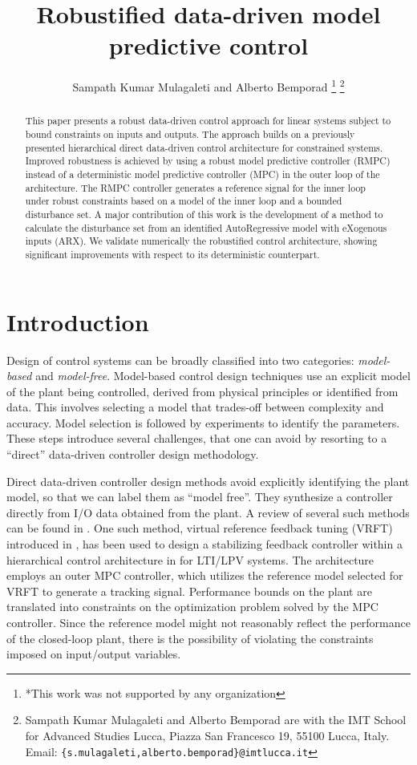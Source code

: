 \documentclass[letterpaper, 10 pt, conference]{ieeeconf}  %
\title{\LARGE \bf
Robustified data-driven model predictive control
}
\author{Sampath Kumar Mulagaleti and Alberto Bemporad%
\thanks{*This work was not supported by any organization}%
\thanks{Sampath Kumar Mulagaleti and Alberto Bemporad are with
		the IMT School for Advanced Studies Lucca, Piazza San Francesco 19,
		55100 Lucca, Italy. 
		 Email: 
	   {\tt\small \{s.mulagaleti,alberto.bemporad\}@imtlucca.it}}%
}
\begin{document}
\maketitle
\thispagestyle{empty}
\pagestyle{empty}


\begin{abstract}

This paper presents a robust data-driven control approach for linear systems subject to bound constraints on inputs and outputs.
 The approach builds on a previously presented hierarchical direct data-driven control architecture for constrained systems. Improved robustness is achieved by using a robust model predictive controller (RMPC) instead of a deterministic model predictive controller (MPC) in the outer loop of the architecture. The RMPC controller generates a reference signal for the inner loop under robust constraints based on a model of the inner loop and a bounded disturbance set. A major contribution of this work is the development of a method to calculate the disturbance set from an identified AutoRegressive model with eXogenous inputs (ARX). We validate numerically the robustified control architecture, showing significant improvements with respect to its deterministic counterpart.

\end{abstract}


\section{Introduction}
Design of control systems can be broadly classified into two categories: \emph{model-based} and \emph{model-free}. Model-based control design techniques use an explicit model of the plant being controlled, derived from physical principles or identified from data. This involves selecting a model that trades-off between complexity and accuracy. Model selection is followed by experiments to identify the parameters. These steps introduce several challenges, that one
can avoid by resorting to a ``direct'' data-driven controller design methodology.

Direct data-driven controller design methods avoid explicitly identifying the plant model, so that we can label them as ``model free''. They synthesize a controller directly from I/O data obtained from the plant. A review of several such methods can be found in \cite{HOU20133}. One such method, virtual reference feedback tuning (VRFT) introduced in \cite{CAMPI20021337}, has been used to design a stabilizing feedback controller within a hierarchical control architecture in \cite{7932940} for LTI/LPV systems. The architecture employs an outer MPC controller, which utilizes the reference model selected for VRFT to generate a tracking signal. Performance bounds on the plant are translated into constraints on the optimization problem solved by the MPC controller. Since the reference model might not reasonably reflect the performance of the closed-loop plant, there is the possibility of violating the constraints imposed on input/output variables. 
\end{document}
